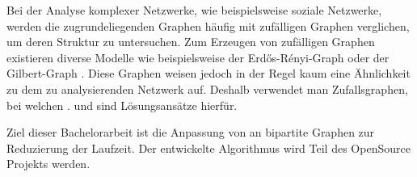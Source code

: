 Bei der Analyse komplexer Netzwerke, wie beispielsweise soziale Netzwerke, 
werden die zugrundeliegenden Graphen häufig mit zufälligen Graphen verglichen, 
um deren Struktur zu untersuchen\cite{DBLP:conf/esa/CarstensH0PTW18}.
%
Zum Erzeugen von zufälligen Graphen existieren diverse Modelle wie 
beispielsweise der Erd\H{o}s-R\'enyi-Graph \cite{erdos}
oder der Gilbert-Graph \cite{gilbert}.
Diese Graphen
weisen jedoch in der Regel kaum eine Ähnlichkeit zu dem zu analysierenden Netzwerk auf.
Deshalb verwendet man Zufallsgraphen, 
bei welchen .
%
\cb{} \cite{curveball} und \gc{}\cite{DBLP:conf/esa/CarstensH0PTW18} sind Lösungsansätze hierfür.
%


Ziel dieser Bachelorarbeit ist die Anpassung von \gc{} an bipartite Graphen zur 
Reduzierung der Laufzeit. Der entwickelte Algorithmus wird Teil des OpenSource Projekts \nk{}\cite{nk_page} werden.
